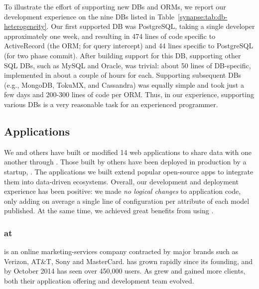 To illustrate the effort of supporting new DBs and ORMs, we report our development experience on the nine DBs listed in Table~\ref{synapse:tab:db-heterogeneity}.
Our first supported DB was PostgreSQL, taking a single developer approximately one week, and resulting in 474 lines of code specific to ActiveRecord (the ORM; for query intercept) and 44 lines specific to PostgreSQL (for two phase commit). 
After building support for this DB, supporting other SQL DBs, such as MySQL and Oracle, was trivial: about 50 lines of DB-specific, implemented in about a couple of hours for each.
Supporting subsequent DBs (e.g., MongoDB, TokuMX, and Cassandra) was equally simple and took just a few days and 200-300 lines of code per ORM.
Thus, in our experience, supporting various DBs is a very reasonable task for an experienced programmer.
\subsection{Applications}
\label{synapse:sec:apps}

We and others have built or modified 14 web applications to share data with
one another through \synapse.  Those built by others have been
deployed in production by a startup, \crowdtap.  The applications we built
extend popular open-source apps to integrate them into data-driven ecosystems. 
Overall, our development and deployment experience has been positive: we made
{\em no logical changes} to application code, only adding on
average a single line of configuration per attribute of each model published.
At the same time, we achieved great benefits from using \synapse.  

\subsubsection{\synapse at \crowdtap}
\label{synapse:sec:apps:crowdtap}

\crowdtap is an online marketing-services company contracted by major brands such as Verizon, AT\&T, Sony and MasterCard.
\crowdtap has grown rapidly since its founding, and by October 2014 has seen over 450,000 users.
As \crowdtap grew and gained more clients, both their application offering and development team evolved.

